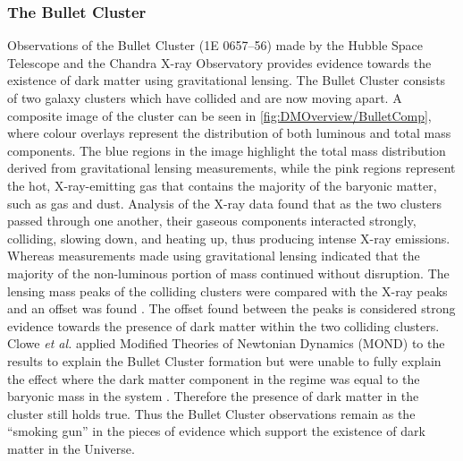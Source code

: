 \subsubsection{The Bullet Cluster}\label{sec:DMOverview/BulletCluster}
Observations of the Bullet Cluster (1E 0657–56) made by the Hubble Space Telescope and the Chandra X-ray Observatory provides evidence towards the existence of dark matter using gravitational lensing.
The Bullet Cluster consists of two galaxy clusters which have collided and are now moving apart. A composite image of the cluster can be seen in \autoref{fig:DMOverview/BulletComp}, where colour overlays represent the distribution of both luminous and total mass components. The blue regions in the image highlight the total mass distribution derived from gravitational lensing measurements, while the pink regions represent the hot, X-ray-emitting gas that contains the majority of the baryonic matter, such as gas and dust. Analysis of the X-ray data found that as the two clusters passed through one another, their gaseous components interacted strongly, colliding, slowing down, and heating up, thus producing intense X-ray emissions. Whereas measurements made using gravitational lensing indicated that the majority of the non-luminous portion of mass continued without disruption. The lensing mass peaks of the colliding clusters were compared with the X-ray peaks and an offset was found \cite{Clowe_2004}. The offset found between the peaks is considered strong evidence towards the presence of dark matter within the two colliding clusters. Clowe \textit{et al.} applied Modified Theories of Newtonian Dynamics (MOND) to the results to explain the Bullet Cluster formation but were unable to fully explain the effect where the dark matter component in the regime was equal to the baryonic mass in the system \cite{Clowe2006}. Therefore the presence of dark matter in the cluster still holds true. Thus the Bullet Cluster observations remain as the ``smoking gun'' in the pieces of evidence which support the existence of dark matter in the Universe.
